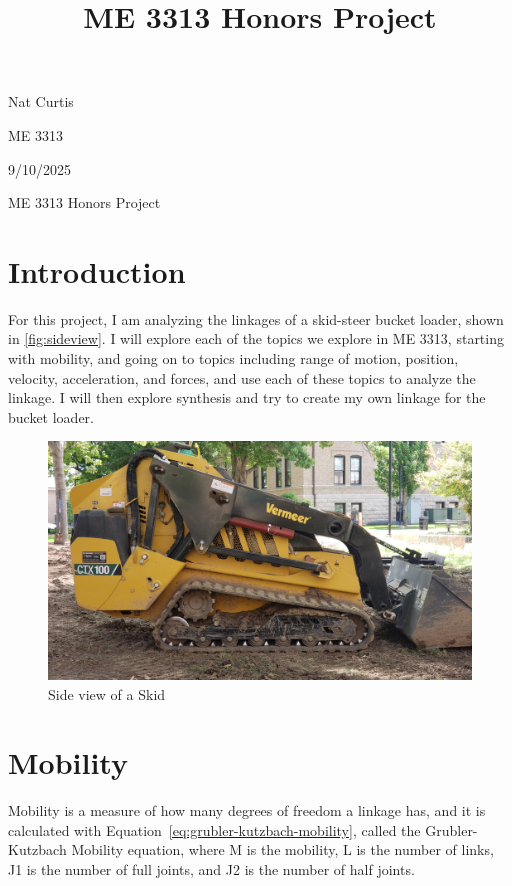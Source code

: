 \documentclass[hidelinks]{article}
\title{ME 3313 Honors Project}
\begin{document}
    \begin{flushleft}
        Nat Curtis
        
        ME 3313
        
        9/10/2025
    \end{flushleft}

    \begin{center}
        \Large ME 3313 Honors Project
    \end{center}


    \FloatBarrier\section*{Introduction}

    For this project, I am analyzing the linkages of a skid-steer bucket loader, shown in \autoref{fig:sideview}. I will explore each of the topics we explore in ME 3313, starting with mobility, and going on to topics including range of motion, position, velocity, acceleration, and forces, and use each of these topics to analyze the linkage. I will then explore synthesis and try to create my own linkage for the bucket loader.
    
    \FloatBarrier\begin{figure}[hb]
        \centering
        \includegraphics[width=1\linewidth]{SkidSteerBucketLoaderVermeerSide.jpg}
        \caption{Side view of a Skid}\label{fig:sideview}
    \end{figure}
    \FloatBarrier\section*{Mobility}
    Mobility is a measure of how many degrees of freedom a linkage has, and it is calculated with Equation~\eqref{eq:grubler-kutzbach-mobility}, called the Grubler-Kutzbach Mobility equation, where M is the mobility, L is the number of links, J1 is the number of full joints, and J2 is the number of half joints.
    
\end{document}
